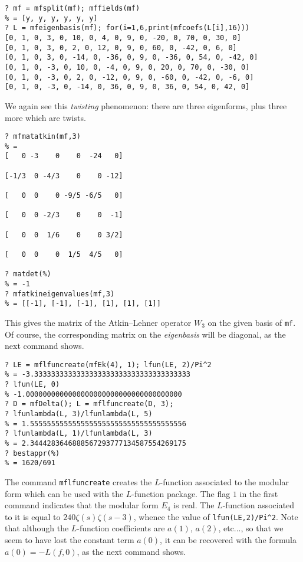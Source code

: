 \documentclass[11pt]{article}
\newcommand{\z}{\zeta}
\def\kbd#1{{\tt #1}}
\begin{document}
\begin{verbatim}
? mf = mfsplit(mf); mffields(mf)
% = [y, y, y, y, y, y]
? L = mfeigenbasis(mf); for(i=1,6,print(mfcoefs(L[i],16)))
[0, 1, 0, 3, 0, 10, 0, 4, 0, 9, 0, -20, 0, 70, 0, 30, 0]
[0, 1, 0, 3, 0, 2, 0, 12, 0, 9, 0, 60, 0, -42, 0, 6, 0]
[0, 1, 0, 3, 0, -14, 0, -36, 0, 9, 0, -36, 0, 54, 0, -42, 0]
[0, 1, 0, -3, 0, 10, 0, -4, 0, 9, 0, 20, 0, 70, 0, -30, 0]
[0, 1, 0, -3, 0, 2, 0, -12, 0, 9, 0, -60, 0, -42, 0, -6, 0]
[0, 1, 0, -3, 0, -14, 0, 36, 0, 9, 0, 36, 0, 54, 0, 42, 0]
\end{verbatim}

We again see this \emph{twisting} phenomenon: there are three eigenforms,
plus three more which are twists.

\begin{verbatim}
? mfmatatkin(mf,3)
% =
[   0 -3    0    0  -24   0]

[-1/3  0 -4/3    0    0 -12]

[   0  0    0 -9/5 -6/5   0]

[   0  0 -2/3    0    0  -1]

[   0  0  1/6    0    0 3/2]

[   0  0    0  1/5  4/5   0]

? matdet(%)
% = -1
? mfatkineigenvalues(mf,3)
% = [[-1], [-1], [-1], [1], [1], [1]]
\end{verbatim}

This gives the matrix of the Atkin--Lehner operator $W_3$ on the given
basis of \kbd{mf}. Of course, the corresponding matrix on the \emph{eigenbasis}
will be diagonal, as the next command shows.

\medskip

\begin{verbatim}
? LE = mflfuncreate(mfEk(4), 1); lfun(LE, 2)/Pi^2
% = -3.3333333333333333333333333333333333333
? lfun(LE, 0)
% -1.0000000000000000000000000000000000000
? D = mfDelta(); L = mflfuncreate(D, 3);
? lfunlambda(L, 3)/lfunlambda(L, 5)
% = 1.5555555555555555555555555555555555556
? lfunlambda(L, 1)/lfunlambda(L, 3)
% = 2.3444283646888567293777134587554269175
? bestappr(%)
% = 1620/691
\end{verbatim}

The command \kbd{mflfuncreate} creates the $L$-function associated to the
modular form which can be used with the $L$-function package.
The flag $1$ in the first command indicates that the modular form $E_4$ is
real. The $L$-function associated to it is equal to $240\z(s)\z(s-3)$,
whence the value of {\tt lfun(LE,2)/Pi\^{}2}. Note that although the
$L$-function coefficients are $a(1)$, $a(2)$, etc..., so that we seem to have
lost the constant term $a(0)$, it can be recovered with the formula
$a(0)=-L(f,0)$, as the next command shows.
\end{document}
